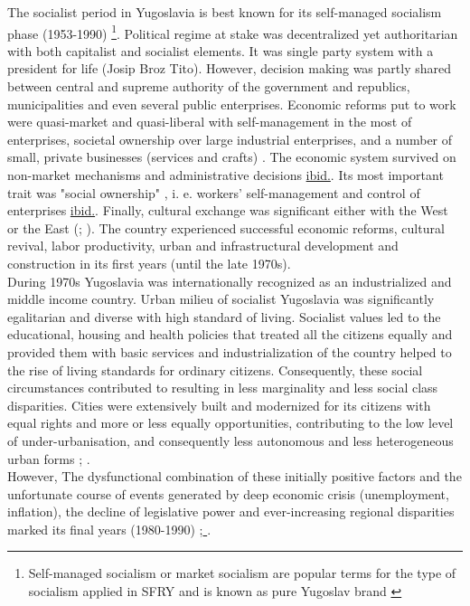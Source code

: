 \documentclass[11pt]{report}
\begin{document}
The socialist period in Yugoslavia is best known for its self-managed socialism phase (1953-1990) \footnote{Self-managed socialism or market socialism are popular terms for the type of socialism applied in SFRY and is known as pure Yugoslav brand \href{ref}{\citealt{estrin_yugoslavia:_1991}}}. Political regime at stake was decentralized yet authoritarian with both capitalist and socialist elements. It was single party system with a president for life (Josip Broz Tito).
However, decision making was partly shared between central and supreme authority of the government and republics, municipalities and even several public enterprises.
Economic reforms put to work were quasi-market and quasi-liberal with self-management in the most of enterprises, societal ownership over large industrial enterprises, and a number of small, private businesses (services and crafts) \href{ref}{\citealt{estrin_yugoslavia:_1991}}.
The economic system survived on non-market mechanisms and administrative decisions \href{ref}{ibid.}.
Its most important trait was "social  ownership" , i. e.  workers' self-management and control of  enterprises \href{ref}{ibid.}. Finally, cultural exchange was significant either with the West or the East (\href{ref}{\citealt{hirt_belgrade_2009}}; \href{ref}{\citealt{vujosevic_conundrum_2012}}).
The country experienced successful economic reforms, cultural revival, labor productivity, urban and infrastructural development and construction in its first years (until the late 1970s).
\\

During 1970s Yugoslavia was internationally recognized as an industrialized and middle income country. 
Urban milieu of socialist Yugoslavia was significantly egalitarian and diverse with high standard of living.
Socialist values led to the educational, housing and health policies that treated all the citizens equally and provided them with basic services and industrialization of the country helped to the rise of living standards for ordinary citizens.
Consequently, these social circumstances contributed to  resulting in less marginality and less social class disparities. 
Cities were extensively built and modernized for its citizens with equal rights and more or less equally opportunities, contributing to the low level of under-urbanisation, and consequently less autonomous and less heterogeneous urban forms \href{ref}{\citealt{vujovic_belgrades_2007}}; \href{ref}{\citealt{stanek_urban_2014}}.
\\

However, The dysfunctional combination of these initially positive factors and the unfortunate course of events generated by deep economic crisis (unemployment, inflation), the decline of legislative power and ever-increasing regional disparities marked its final years (1980-1990) \href{ref}{\citealt{estrin_yugoslavia:_1991}};\href{ref}{ \citealt{stambolieva_welfare_2013}}.
\\
\end{document}
